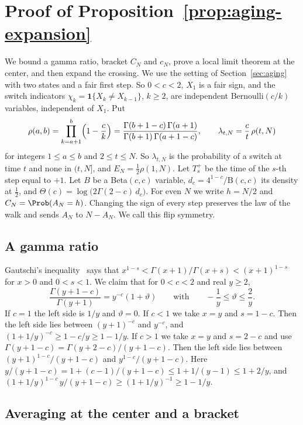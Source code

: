 \section{Proof of Proposition~\ref{prop:aging-expansion}}\label{app:aging}

We bound a gamma ratio, bracket $C_N$ and $c_N$, prove a local limit theorem
at the center, and then expand the crossing. We use the setting of
Section~\ref{sec:aging} with two states and a fair first step. So $0<c<2$, $X_1$ is a fair sign, and the switch indicators
$\chi_k=\mathbf 1\{X_k\ne X_{k-1}\}$, $k\ge2$, are independent
Bernoulli$(c/k)$ variables, independent of $X_1$. Put
\[
\rho(a,b)=\prod_{k=a+1}^{b}\Bigl(1-\frac ck\Bigr)
=\frac{\Gamma(b+1-c)\,\Gamma(a+1)}{\Gamma(b+1)\,\Gamma(a+1-c)},\qquad
\lambda_{t,N}=\frac ct\,\rho(t,N)
\]
for integers $1\le a\le b$ and $2\le t\le N$. So $\lambda_{t,N}$ is the
probability of a switch at time $t$ and none in $(t,N]$, and
$E_N=\frac12\rho(1,N)$. Let $T^+_s$ be the time of the $s$-th step equal to
$+1$. Let $B$ be a Beta$(c,c)$ variable, $d_c=4^{1-c}/\mathrm B(c,c)$ its
density at $\frac12$, and $\Theta(c)=\log\bigl(2\Gamma(2-c)\,d_c\bigr)$. For
even $N$ we write $h=N/2$ and $C_N=\Prob(A_N=h)$. Changing the sign of every
step preserves the law of the walk and sends $A_N$ to $N-A_N$. We call this
flip symmetry.

\subsection{A gamma ratio}

Gautschi's inequality~\cite[5.6.4]{dlmf} says that
$x^{1-s}<\Gamma(x+1)/\Gamma(x+s)<(x+1)^{1-s}$ for $x>0$ and $0<s<1$. We
claim that for $0<c<2$ and real $y\ge2$,
\begin{equation}\label{eq:D-gamma}
\frac{\Gamma(y+1-c)}{\Gamma(y+1)}=y^{-c}(1+\vartheta)\qquad\text{with}\qquad
-\frac1y\le\vartheta\le\frac2y .
\end{equation}
If $c=1$ the left side is $1/y$ and $\vartheta=0$. If $c<1$ we take $x=y$ and
$s=1-c$. Then the left side lies between $(y+1)^{-c}$ and $y^{-c}$, and
$(1+1/y)^{-c}\ge1-c/y\ge1-1/y$. If $c>1$ we take $x=y$ and $s=2-c$ and use
$\Gamma(y+1-c)=\Gamma(y+2-c)/(y+1-c)$. Then the left side lies between
$(y+1)^{1-c}/(y+1-c)$ and $y^{1-c}/(y+1-c)$. Here
$y/(y+1-c)=1+(c-1)/(y+1-c)\le1+1/(y-1)\le1+2/y$, and
$(1+1/y)^{1-c}\,y/(y+1-c)\ge(1+1/y)^{-1}\ge1-1/y$.

\subsection{Averaging at the center and a bracket}

